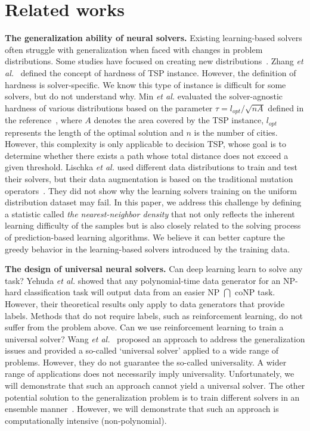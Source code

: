 \section{Related works}
\textbf{The generalization ability of neural solvers.} Existing learning-based solvers often struggle with generalization when faced with changes in problem distributions. Some studies have focused on creating new distributions~\cite{wang2021game, zhang2022learning}. Zhang \emph{et al.}~\cite{zhang2022learning} defined the concept of hardness of TSP instance. However, the definition of hardness is solver-specific. We know this type of instance is difficult for some solvers, but do not understand why. Min \emph{et al.} evaluated the solver-agnostic hardness of various distributions based on the parameter $\tau=l_{opt}/\sqrt{nA}$ defined in the reference~\cite{gent1996tsp}, where $A$ denotes the area covered by the TSP instance, $l_{opt}$ represents the length of the optimal solution and $n$ is the number of cities. However, this complexity is only applicable to decision TSP, whose goal is to determine whether there exists a path whose total distance does not exceed a given threshold. Lischka \emph{et al.}\cite{lischka2024less} used different data distributions to train and test their solvers, but their data augmentation is based on the traditional mutation operators~\cite{bossek2019evolving}. They did not show why the learning solvers training on the uniform distribution dataset may fail. In this paper, we address this challenge by defining a statistic called \emph{the nearest-neighbor density} that not only reflects the inherent learning difficulty of the samples but is also closely related to the solving process of prediction-based learning algorithms. We believe it can better capture the greedy behavior in the learning-based solvers introduced by the training data.

\textbf{The design of universal neural solvers.} Can deep learning learn to solve any task? Yehuda \emph{et al.} \cite{yehuda2020s} showed that any polynomial-time data generator for an NP-hard classification task will output data from an easier NP $\bigcap$ coNP task. However, their theoretical results only apply to data generators that provide labels. Methods that do not require labels, such as reinforcement learning, do not suffer from the problem above. Can we use reinforcement learning to train a universal solver? Wang \emph{et al.}~\cite{wang2024asp} proposed an approach to address the generalization issues and provided a so-called `universal solver' applied to a wide range of problems. However, they do not guarantee the so-called universality. A wider range of applications does not necessarily imply universality. Unfortunately, we will demonstrate that such an approach cannot yield a universal solver. The other potential solution to the generalization problem is to train different solvers in an ensemble manner~\cite{gil2023evolving}. However, we will demonstrate that such an approach is computationally intensive (non-polynomial).